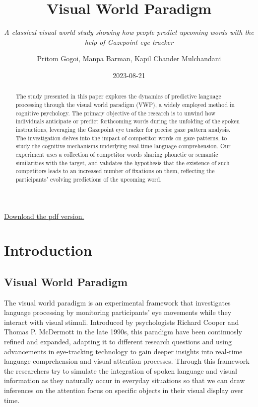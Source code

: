 \documentclass[
  a4paper,
]{article}
\title{\textbf{Visual World Paradigm}}
\subtitle{\emph{A classical visual world study showing how people
predict upcoming words with the help of Gazepoint eye tracker}}
\author{Pritom Gogoi, Manpa Barman, Kapil Chander Mulchandani}
\date{2023-08-21}
\renewcommand*\contentsname{Table of contents}
\newcommand\contentsname{Table of contents}
\begin{document}
\maketitle
\begin{abstract}
The study presented in this paper explores the dynamics of predictive
language processing through the visual world paradigm (VWP), a widely
employed method in cognitive psychology. The primary objective of the
research is to unwind how individuals anticipate or predict forthcoming
words during the unfolding of the spoken instructions, leveraging the
Gazepoint eye tracker for precise gaze pattern analysis. The
investigation delves into the impact of competitor words on gaze
patterns, to study the cognitive mechanisms underlying real-time
language comprehension. Our experiment uses a collection of competitor
words sharing phonetic or semantic similarities with the target, and
validates the hypothesis that the existence of such competitors leads to
an increased number of fixations on them, reflecting the participants'
evolving predictions of the upcoming word.
\end{abstract}
\ifdefined\Shaded\renewenvironment{Shaded}{\begin{tcolorbox}[frame hidden, interior hidden, boxrule=0pt, borderline west={3pt}{0pt}{shadecolor}, sharp corners, breakable, enhanced]}{\end{tcolorbox}}\fi

\renewcommand*\contentsname{Table of contents}
{
\hypersetup{linkcolor=}
\setcounter{tocdepth}{3}
\tableofcontents
}
\href{./report/docs/report.pdf}{Download the pdf version.}

\hypertarget{introduction}{%
\section{Introduction}\label{introduction}}

\hypertarget{visual-world-paradigm}{%
\subsection{Visual World Paradigm}\label{visual-world-paradigm}}

The visual world paradigm is an experimental framework that investigates
language processing by monitoring participants' eye movements while they
interact with visual stimuli. Introduced by psychologists Richard Cooper
and Thomas P. McDermott in the late 1990s, this paradigm have been
continuosly refined and expanded, adapting it to different research
questions and using advancements in eye-tracking technology to gain
deeper insights into real-time language comprehension and visual
attention processes. Through this framework the researchers try to
simulate the integration of spoken language and visual information as
they naturally occur in everyday situations so that we can draw
inferences on the attention focus on specific objects in their visual
display over time.
\end{document}

